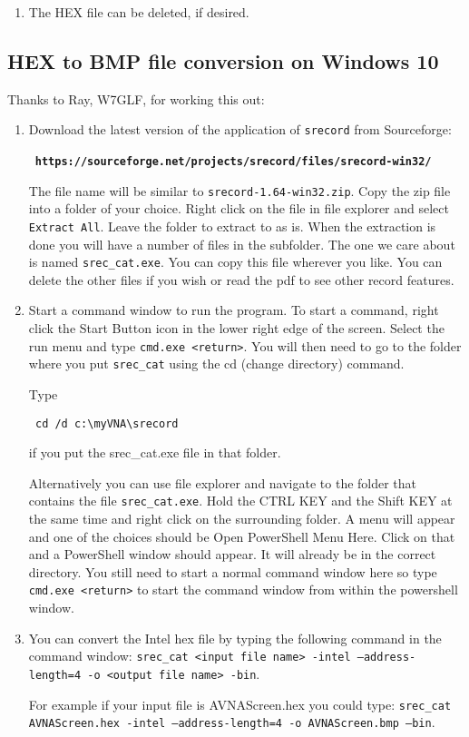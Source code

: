 \begin{description}
\begin{enumerate}
\item The HEX file can be deleted, if desired.
\end{enumerate}

\subsection{HEX to BMP file conversion on Windows 10}  Thanks to Ray, W7GLF, for working this out:
\begin{enumerate}
 \item Download the latest version of the application of \texttt{srecord} from Sourceforge:

{\scriptsize\ \textbf{\texttt{https://sourceforge.net/projects/srecord/files/srecord-win32/}}}


The file name will be similar to \texttt{srecord-1.64-win32.zip}.  Copy the zip file into a folder of your choice.  Right click on the file in file explorer and select \texttt{Extract All}.  Leave the folder to extract to as is.  When the extraction is done you will have a number of files in the subfolder.  The one we care about is named \texttt{srec\_cat.exe}.  You can copy this file wherever you like.  You can delete the other files if you wish or read the pdf to see other record features.

\item Start a command window to run the program.  To start a command, right click the Start Button icon in the lower right edge of the screen.  Select the run menu and type \texttt{cmd.exe <return>}.  You will then need to go to the folder where you put \texttt{srec\_cat} using the cd (change directory) command.

Type \begin{verbatim} cd /d c:\myVNA\srecord\end{verbatim} if you put the srec\_cat.exe file in that folder.

Alternatively you can use file explorer and navigate to the folder that contains the file \texttt{srec\_cat.exe}.  Hold the CTRL KEY and the Shift KEY at the same time and right click on the surrounding folder.  A menu will appear and one of the choices should be Open PowerShell Menu Here.  Click on that and a PowerShell window should appear.  It will already be in the correct directory.  You still need to start a normal command window here so type \texttt{cmd.exe <return>} to start the command window from within the powershell window.

\item You can convert the Intel hex file by typing the following command in the command window:  \texttt{srec\_cat  <input file name> -intel --address-length=4 -o <output file name>  -bin}.

For example if your input file is AVNAScreen.hex you could type: \texttt{srec\_cat  AVNAScreen.hex -intel --address-length=4 -o AVNAScreen.bmp –bin}.
\end{enumerate}
\end{description}

